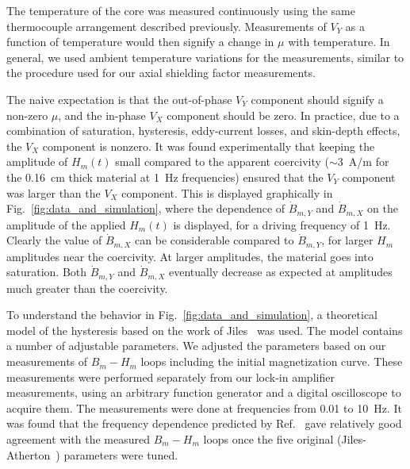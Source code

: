 The temperature of the core was measured continuously using the same
thermocouple arrangement described previously.  Measurements of $V_Y$
as a function of temperature would then signify a change in $\mu$ with
temperature.  In general, we used ambient temperature variations for
the measurements, similar to the procedure used for our axial
shielding factor measurements.


The naive expectation is that the out-of-phase $V_Y$ component should
signify a non-zero $\mu$, and the in-phase $V_X$ component should be
zero.  In practice, due to a combination of saturation, hysteresis,
eddy-current losses, and skin-depth effects, the $V_X$ component is
nonzero.  It was found experimentally that keeping the amplitude of
$H_m(t)$ small compared to the apparent coercivity ($\sim 3$~A/m for
the 0.16~cm thick material at 1~Hz frequencies) ensured that the $V_Y$
component was larger than the $V_X$ component.  This is displayed
graphically in Fig.~\ref{fig:data_and_simulation}, where the
dependence of $\dot{B}_{m,Y}$ and $\dot{B}_{m,X}$ on the amplitude of
the applied $H_m(t)$ is displayed, for a driving frequency of 1~Hz.
Clearly the value of $\dot{B}_{m,X}$ can be considerable compared to
$\dot{B}_{m,Y}$, for larger $H_m$ amplitudes near the coercivity.  At
larger amplitudes, the material goes into saturation.  Both
$\dot{B}_{m,Y}$ and $\dot{B}_{m,X}$ eventually decrease as expected at
amplitudes much greater than the coercivity.

To understand the behavior in Fig.~\ref{fig:data_and_simulation}, a
theoretical model of the hysteresis based on the work of
Jiles~\cite{bib:jiles} was used.  The model contains a number of
adjustable parameters.  We adjusted the parameters based on our
measurements of $B_m-H_m$ loops including the initial magnetization
curve.  These measurements were performed separately from our lock-in
amplifier measurements, using an arbitrary function generator and a
digital oscilloscope to acquire them.  The measurements were done at
frequencies from 0.01 to 10~Hz.  It was found that the frequency
dependence predicted by Ref.~\cite{bib:jiles} gave relatively good
agreement with the measured $B_m-H_m$ loops once the five original
(Jiles-Atherton~\cite{bib:jiles-atherton}) parameters were tuned.

